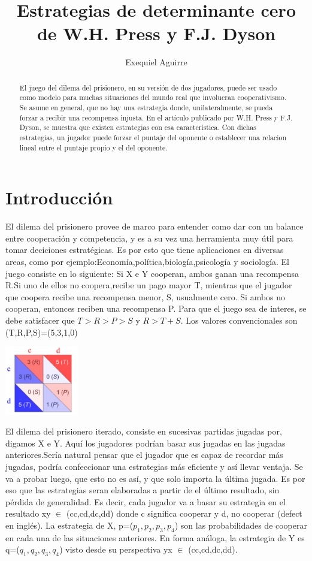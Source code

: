 \documentclass[12pt]{article}
\author{Exequiel Aguirre}
\title{Estrategias de determinante cero de W.H. Press y F.J. Dyson}
\date{}
\begin{document}
\maketitle

\begin{abstract}
El juego del dilema del prisionero, en su versión de dos jugadores, puede ser usado como modelo para 
muchas situaciones del mundo real que involucran cooperativismo. Se asume en general, que no hay una estrategia
donde, unilateralmente, se pueda forzar a recibir una recompensa injusta.
En el artículo publicado por W.H. Press y F.J. Dyson, se muestra que existen estrategias con esa característica.
Con dichas estrategias, un jugador puede forzar el puntaje del oponente o establecer una relacion lineal entre
el puntaje propio y el del oponente.
\end{abstract}




\section{Introducción}
El dilema del prisionero provee de  marco para entender como dar con un balance entre cooperación y competencia, y es
a su vez una herramienta muy útil para tomar deciciones estratégicas.
Es por esto que tiene aplicaciones en diversas areas, como por ejemplo:Economía,política,biología,psicología y sociología.
El juego consiste en lo siguiente:
Si X e Y cooperan, ambos ganan una recompensa R.Si uno de ellos no coopera,recibe un pago mayor T, mientras que el
jugador que coopera recibe una recompensa menor, S, usualmente cero. Si ambos no cooperan, entonces reciben una recompensa P.
Para que el juego sea de interes, se debe satisfacer que $T >  R > P > S$ y $R > T+S$.
Los valores convencionales son (T,R,P,S)=(5,3,1,0)
\begin{center}
\includegraphics[height=3cm]{./pd.png}
\end{center}


El dilema del prisionero iterado, consiste en sucesivas partidas jugadas por, digamos X e Y.
Aquí los jugadores podrían basar sus jugadas en las jugadas anteriores.Sería natural pensar que el jugador que es
capaz de recordar más jugadas, podría confeccionar una estrategias más eficiente y así llevar ventaja.
Se va a probar luego, que esto no es así, y que solo importa la última jugada. Es por eso que las estrategias seran elaboradas
a partir de el último resultado, sin pérdida de generalidad.
Es decir, cada jugador va a basar su estrategia en el resultado xy $\in$ (cc,cd,dc,dd) donde c significa cooperar y d, no cooperar 
(defect en inglés). La estrategia de X, p=($p_1,p_2,p_3,p_4$) son las probabilidades de cooperar en cada una de las situaciones 
anteriores. En forma análoga, la estrategia de Y es q=($q_1,q_2,q_3,q_4$) visto desde su perspectiva yx $\in$ (cc,cd,dc,dd).
\end{document}
